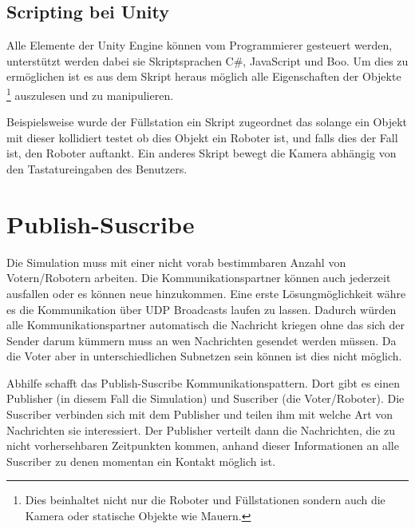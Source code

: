 \subsection{Scripting bei Unity}
Alle Elemente der Unity Engine k{\"{o}}nnen vom Programmierer gesteuert werden, unterst{\"{u}}tzt werden dabei sie Skriptsprachen C\#, JavaScript und Boo.\cite{wiki:unity} Um dies zu erm{\"{o}}glichen ist es aus dem Skript heraus m{\"{o}}glich alle Eigenschaften
der Objekte \footnote{Dies beinhaltet nicht nur die Roboter und F{\"{u}}llstationen sondern auch die Kamera oder statische Objekte wie Mauern.} auszulesen und zu manipulieren.

Beispielsweise wurde der F{\"{u}}llstation ein Skript zugeordnet das solange ein Objekt mit dieser kollidiert testet ob dies Objekt ein Roboter ist, und falls dies der Fall ist,
den Roboter auftankt. Ein anderes Skript bewegt die Kamera abh{\"{a}}ngig von den Tastatureingaben des Benutzers.

\clearpage
\section{Publish-Suscribe}
Die Simulation muss mit einer nicht vorab bestimmbaren Anzahl von Votern/Robotern arbeiten. Die Kommunikationspartner k{\"{o}}nnen auch jederzeit ausfallen oder es k{\"{o}}nnen neue hinzukommen.
Eine erste L{\"{o}}sungm{\"{o}}glichkeit w{\"{a}}hre es die Kommunikation {\"{u}}ber UDP Broadcasts
laufen zu lassen. Dadurch w{\"{u}}rden alle Kommunikationspartner automatisch die Nachricht kriegen ohne
das sich der Sender darum k{\"{u}}mmern muss an wen Nachrichten gesendet werden m{\"{u}}ssen. Da die
Voter aber in unterschiedlichen Subnetzen sein k{\"{o}}nnen ist dies nicht m{\"{o}}glich.

Abhilfe schafft das Publish-Suscribe Kommunikationspattern\cite{pubsub}. Dort gibt es einen Publisher (in
diesem Fall die Simulation) und Suscriber (die Voter/Roboter). Die Suscriber verbinden sich mit dem
Publisher und teilen ihm mit welche Art von Nachrichten sie interessiert. Der Publisher verteilt dann die
Nachrichten, die zu nicht vorhersehbaren Zeitpunkten kommen, anhand dieser Informationen an alle Suscriber zu denen momentan ein Kontakt m{\"{o}}glich ist.

